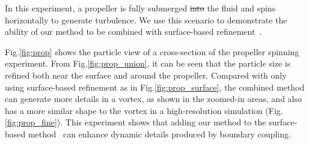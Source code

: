 \documentclass[VANCOUVER,STIX1COL]{WileyNJD-v2}
\providecommand{\DIFadd}[1]{{\protect\color{blue}\uwave{#1}}} %
\providecommand{\DIFdel}[1]{{\protect\color{red}\sout{#1}}}                      %
\providecommand{\DIFaddbegin}{} %
\providecommand{\DIFaddend}{} %
\providecommand{\DIFdelbegin}{} %
\providecommand{\DIFdelend}{} %
\begin{document}
In this experiment, a propeller is fully submerged \DIFdelbegin \DIFdel{into }\DIFdelend \DIFaddbegin \DIFadd{in }\DIFaddend the fluid and spins horizontally to generate turbulence. We use this scenario to demonstrate the ability of our method to be combined with surface-based refinement~\cite{Winchenbach17}.

Fig.\ref{fig:prop} shows the particle view of a cross-section of the propeller spinning experiment. From Fig.\ref{fig:prop_union}, it can be seen that the particle size is refined both near the surface and around the propeller. Compared with only using surface-based refinement as in Fig.\ref{fig:prop_surface}, the combined method can generate more details in a vortex, as shown in the zoomed-in areas, and also has a more similar shape to the vortex in a high-resolution simulation (Fig.\ref{fig:prop_fine}). This experiment shows that adding our method to the surface-based method~\cite{Winchenbach17} can enhance dynamic details produced by boundary coupling.
\end{document}
